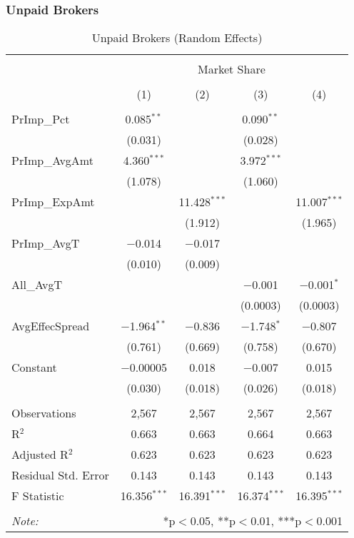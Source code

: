 \documentclass[12pt,a4paper]{article}
\begin{document}
		\pagebreak
	
		\subsubsection{Unpaid Brokers}
		
		\vspace{10em}
	
		\begin{table}[!htbp] \centering 
			\captionsetup{font=large}
			\caption{Unpaid Brokers (Random Effects)} 
			\label{} 
			\begin{tabular}{@{\extracolsep{1em}}lcccc} 
				\\[-1.8ex]\hline 
				\hline \\[-1.8ex] 
				& \multicolumn{4}{c}{Market Share} \\ 
				\cline{2-5} 
				\\[-1.8ex] & (1) & (2) & (3) & (4)\\ 
				\hline \\[-1.8ex] 
				PrImp\_Pct & 0.085$^{**}$ &  & 0.090$^{**}$ &  \\ 
				& (0.031) &  & (0.028) &  \\ 
				PrImp\_AvgAmt & 4.360$^{***}$ &  & 3.972$^{***}$ &  \\ 
				& (1.078) &  & (1.060) &  \\ 
				PrImp\_ExpAmt &  & 11.428$^{***}$ &  & 11.007$^{***}$ \\ 
				&  & (1.912) &  & (1.965) \\ 
				PrImp\_AvgT & $-$0.014 & $-$0.017 &  &  \\ 
				& (0.010) & (0.009) &  &  \\ 
				All\_AvgT &  &  & $-$0.001 & $-$0.001$^{*}$ \\ 
				&  &  & (0.0003) & (0.0003) \\ 
				AvgEffecSpread & $-$1.964$^{**}$ & $-$0.836 & $-$1.748$^{*}$ & $-$0.807 \\ 
				& (0.761) & (0.669) & (0.758) & (0.670) \\ 
				Constant & $-$0.00005 & 0.018 & $-$0.007 & 0.015 \\ 
				& (0.030) & (0.018) & (0.026) & (0.018) \\ 
				\hline \\[-1.8ex] 
				Observations & 2,567 & 2,567 & 2,567 & 2,567 \\ 
				R$^{2}$ & 0.663 & 0.663 & 0.664 & 0.663 \\ 
				Adjusted R$^{2}$ & 0.623 & 0.623 & 0.623 & 0.623 \\ 
				Residual Std. Error & 0.143 & 0.143  & 0.143  & 0.143  \\ 
				F Statistic & 16.356$^{***}$  & 16.391$^{***}$  & 16.374$^{***}$  & 16.395$^{***}$  \\ 
				\hline 
				\hline \\[-1.8ex] 
				\textit{Note:}  & \multicolumn{4}{r}{*p$<$0.05, **p$<$0.01, ***p$<$0.001} \\ 
			\end{tabular} 
		\end{table} 
	
\end{document}
